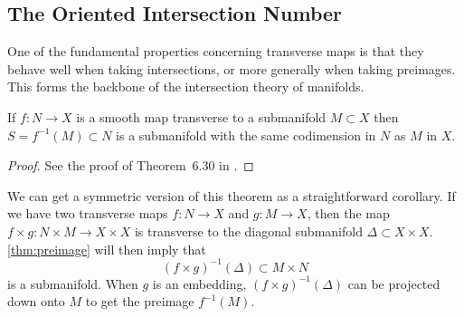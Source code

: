 \subsection{The Oriented Intersection Number}

One of the fundamental properties concerning transverse maps is that they behave well when taking intersections, or more generally when taking preimages. This forms the backbone of the intersection theory of manifolds.

\begin{theorem}\label{thm:preimage}
	If $f : N \to X$ is a smooth map transverse to a submanifold $M\subset X$ then $S=f^{-1}(M)\subset N$ is a submanifold with the same codimension in $N$ as $M$ in $X$.
\end{theorem}
\begin{proof}
	See the proof of Theorem~6.30 in \cite{lee2012smooth}.
\end{proof}

\begin{remark}\label{rmk:symmetric-preimage-theorem}
	We can get a symmetric version of this theorem as a straightforward corollary. If we have two transverse maps $f : N\to X$ and $g : M\to X$, then the map $f\times g : N\times M \to X\times X$ is transverse to the diagonal submanifold $\Delta\subset X\times X$. \cref{thm:preimage} will then imply that 
	\[
		(f\times g)^{-1}(\Delta) \subset M\times N
	\]
	is a submanifold. When $g$ is an embedding, $(f\times g)^{-1}(\Delta)$ can be projected down onto $M$ to get the preimage $f^{-1}(M)$.
\end{remark}

